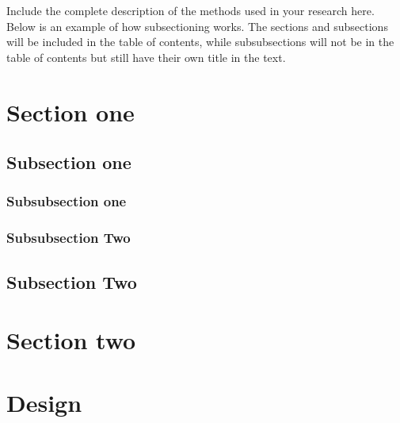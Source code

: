 
Include the complete description of the methods used in your research here. \\

\noindent Below is an example of how subsectioning works. The sections and subsections will be included in the table of contents, while subsubsections will not be in the table of contents but still have their own title in the text.

\section{Section one}

\subsection{Subsection one}

\subsubsection{Subsubsection one}

\subsubsection{Subsubsection Two}

\subsection{Subsection Two}

\section{Section two}

\section{Design}
